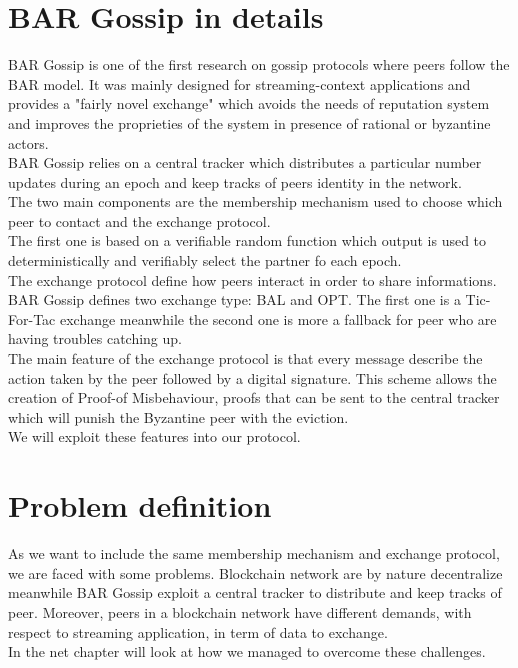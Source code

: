 \documentclass[mscthesis]{usiinfthesis}
\begin{document}
\section{BAR Gossip in details}
BAR Gossip is one of the first research on gossip protocols where peers follow the BAR model. It was mainly designed for streaming-context applications and provides a "fairly novel exchange" which avoids the needs of reputation system and improves the proprieties of the system in presence of rational or byzantine actors. \\
BAR Gossip relies on a central tracker which distributes a particular number updates during an epoch and keep tracks of peers identity in the network. \\
The two main components are the membership mechanism used to choose which peer to contact and the exchange protocol. \\
The first one is based on a verifiable random function which output is used to deterministically and verifiably select the partner fo each epoch. \\
The exchange protocol define how peers interact in order to share informations.
BAR Gossip defines two exchange type: BAL and OPT. The first one is a Tic-For-Tac exchange meanwhile the second one is more a fallback for peer who are having troubles catching up. \\
The main feature of the exchange protocol is that every message describe the action taken by the peer followed by a digital signature. This scheme allows the creation of Proof-of Misbehaviour, proofs that can be sent to the central tracker which will punish the Byzantine peer with the eviction. \\
We will exploit these features into our protocol.
\section{Problem definition}
As we want to include the same membership mechanism and exchange protocol, we are faced with some problems. Blockchain network are by nature decentralize meanwhile BAR Gossip exploit a central tracker to distribute and keep tracks of peer. Moreover, peers in a blockchain network have different demands, with respect to streaming application, in term of data to exchange. \\
In the net chapter will look at how we managed to overcome these challenges.
\end{document}
